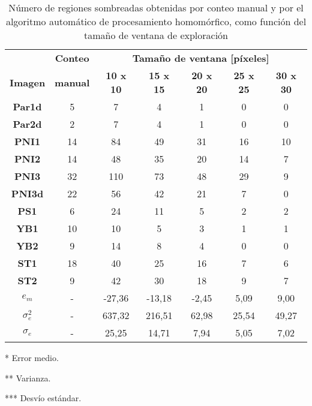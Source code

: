 \begin{table}[]
    \centering
    \begin{threeparttable}[b]
        
        \caption{Número de regiones sombreadas obtenidas por conteo manual y por el algoritmo automático de procesamiento homomórfico, como función del tamaño de ventana de exploración}
        \label{tab:resultados_homomorfico}
        \begin{tabular}{ccccccc}
        \hline
        \hline
                  & \textbf{Conteo}  & \multicolumn{5}{c}{\textbf{Tamaño de ventana [píxeles]}}   \\
            \textbf{Imagen}& \textbf{manual}  & \textbf{10 x 10}     & \textbf{15 x 15}     & \textbf{20 x 20 }   & \textbf{25 x 25}    & \textbf{30 x 30 }   \\ \hline
            \textbf{Par1d}  & 5  & 7      & 4      & 1     & 0     & 0     \\
            \textbf{Par2d}  & 2  & 7      & 4      & 1     & 0     & 0     \\
            \textbf{PNI1}   & 14 & 84     & 49     & 31    & 16    & 10    \\
            \textbf{PNI2}   & 14 & 48     & 35     & 20    & 14    & 7     \\
            \textbf{PNI3}   & 32 & 110    & 73     & 48    & 29    & 9     \\
            \textbf{PNI3d}  & 22 & 56     & 42     & 21    & 7     & 0     \\
            \textbf{PS1}    & 6  & 24     & 11     & 5     & 2     & 2     \\ 
            \textbf{YB1}    & 10 & 10     & 5      & 3     & 1     & 1     \\
            \textbf{YB2}    & 9  & 14     & 8      & 4     & 0     & 0     \\
            \textbf{ST1}    & 18 & 40     & 25     & 16    & 7     & 6     \\
            \textbf{ST2}    & 9  & 42     & 30     & 18    & 9     & 7     \\ \hline
            $e_{m}$\tnote{*}    & -  & -27,36 & -13,18 & -2,45 & 5,09  & 9,00  \\ 
            $\sigma^2_{e}$ \tnote{**}   & -  & 637,32  & 216,51 & 62,98 & 25,54 & 49,27 \\
           $\sigma_{e}$ \tnote{***}   & -  & 25,25  & 14,71  & 7,94  & 5,05  & 7,02  \\ \hline \hline
        \end{tabular}
        \begin{tablenotes}
        \tiny{
                \item [*]Error medio.
                \item [**]Varianza.
                \item [***] Desvío estándar.
                }
        \end{tablenotes}
  \end{threeparttable}
\end{table}
       